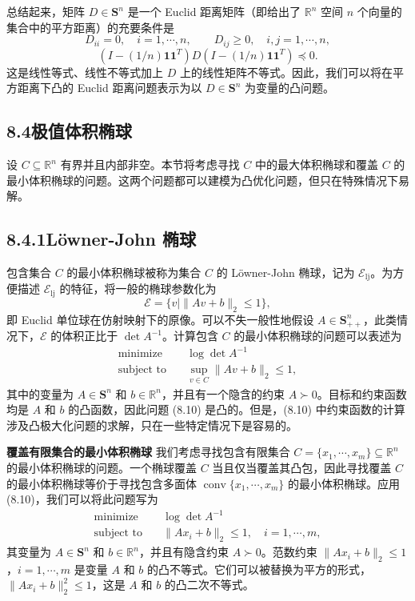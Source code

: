 \documentclass[UTF8, 12pt, fontset=fandol, oneside]{ctexart}
\begin{document}
总结起来，矩阵 $D\in\mathbf{S}^n$ 是一个 Euclid 距离矩阵（即给出了 $\mathbb{R}^n$ 空间 $n$ 个向量的集合中的平方距离）的充要条件是
\[
D_{ii}=0,\quad i=1,\cdots,n,\qquad D_{ij}\geq 0,\quad i,j=1,\cdots,n,
\]
\[
(I-(1/n)\mathbf{1}\mathbf{1}^T)D(I-(1/n)\mathbf{1}\mathbf{1}^T)\preceq 0.
\]
这是线性等式、线性不等式加上 $D$ 上的线性矩阵不等式。因此，我们可以将在平方距离下凸的 Euclid 距离问题表示为以 $D\in\mathbf{S}^n$ 为变量的凸问题。

\subsection*{8.4\quad 极值体积椭球}

设 $C\subseteq\mathbb{R}^n$ 有界并且内部非空。本节将考虑寻找 $C$ 中的最大体积椭球和覆盖 $C$ 的最小体积椭球的问题。这两个问题都可以建模为凸优化问题，但只在特殊情况下易解。

\subsection*{8.4.1\quad Löwner-John 椭球}

包含集合 $C$ 的最小体积椭球被称为集合 $C$ 的 Löwner-John 椭球，记为 $\mathcal{E}_{\mathrm{lj}}$。为方便描述 $\mathcal{E}_{\mathrm{lj}}$ 的特征，将一般的椭球参数化为
\begin{equation}
\mathcal{E}=\{v\mid \|Av+b\|_2\leq 1\},
\tag{8.9}
\end{equation}
即 Euclid 单位球在仿射映射下的原像。可以不失一般性地假设 $A\in\mathbf{S}_{++}^n$，此类情况下，$\mathcal{E}$ 的体积正比于 $\det A^{-1}$。计算包含 $C$ 的最小体积椭球的问题可以表述为
\begin{equation}
\begin{aligned}
\text{minimize}\quad & \log\det A^{-1}\\
\text{subject to}\quad & \sup_{v\in C}\|Av+b\|_2\leq 1,
\end{aligned}
\tag{8.10}
\end{equation}
其中的变量为 $A\in\mathbf{S}^n$ 和 $b\in\mathbb{R}^n$，并且有一个隐含的约束 $A\succ 0$。目标和约束函数均是 $A$ 和 $b$ 的凸函数，因此问题 (8.10) 是凸的。但是，(8.10) 中约束函数的计算涉及凸极大化问题的求解，只在一些特定情况下是容易的。

\noindent\textbf{覆盖有限集合的最小体积椭球}\quad
我们考虑寻找包含有限集合 $C=\{x_1,\cdots,x_m\}\subseteq\mathbb{R}^n$ 的最小体积椭球的问题。一个椭球覆盖 $C$ 当且仅当覆盖其凸包，因此寻找覆盖 $C$ 的最小体积椭球等价于寻找包含多面体 $\operatorname{conv}\{x_1,\cdots,x_m\}$ 的最小体积椭球。应用 (8.10)，我们可以将此问题写为
\begin{equation}
\begin{aligned}
\text{minimize}\quad & \log\det A^{-1}\\
\text{subject to}\quad & \|Ax_i+b\|_2\leq 1,\quad i=1,\cdots,m,
\end{aligned}
\tag{8.11}
\end{equation}
其变量为 $A\in\mathbf{S}^n$ 和 $b\in\mathbb{R}^n$，并且有隐含约束 $A\succ 0$。范数约束 $\|Ax_i+b\|_2\leq 1$，$i=1,\cdots,m$ 是变量 $A$ 和 $b$ 的凸不等式。它们可以被替换为平方的形式，$\|Ax_i+b\|_2^2\leq 1$，这是 $A$ 和 $b$ 的凸二次不等式。
\end{document}

